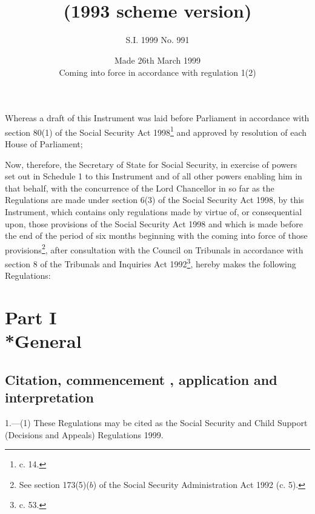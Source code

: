 \documentclass[12pt,a4paper]{article}
\title{\regstitle\\(1993 scheme version)}
\title{\regstitle}
\author{S.I. 1999 No. 991}
\date{Made 26th March 1999\\Coming into force in accordance with regulation 1(2)}
\begin{document}
\maketitle

\noindent
Whereas a draft of this Instrument was laid before Parliament in accordance with section 80(1) of the Social Security Act 1998\footnote{ c. 14.} and approved by resolution of each House of Parliament;

 Now, therefore, the Secretary of State for Social Security, in exercise of powers set out in Schedule 1 to this Instrument and of all other powers enabling him in that behalf, with the concurrence of the Lord Chancellor in so far as the Regulations are made under section 6(3) of the Social Security Act 1998, by this Instrument, which contains only regulations made by virtue of, or consequential upon, those provisions of the Social Security Act 1998 and which is made before the end of the period of six months beginning with the coming into force of those provisions\footnote{\frenchspacing See section 173(5)($b$) of the Social Security Administration Act 1992 (c. 5).}, after consultation with the Council on Tribunals in accordance with section 8 of the Tribunals and Inquiries Act 1992\footnote{ c. 53.}, hereby makes the following Regulations:

{\sloppy

\tableofcontents

}

\bigskip

\setcounter{secnumdepth}{-2}

\section[Part I --- General]{Part I\\*General}

\renewcommand\parthead{--- Part I}

\subsection[1. Citation, commencement%
, application and interpretation   %
]{Citation, commencement%
, application and interpretation   %
}

1.—(1) These Regulations may be cited as the Social Security and Child Support (Decisions and Appeals) Regulations 1999.
\end{document}
